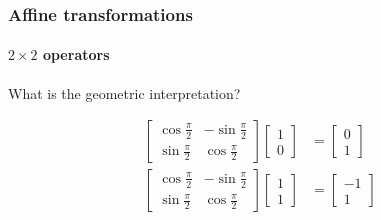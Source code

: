 \documentclass[xcolor=dvipsnames]{beamer}
\begin{document}
\begin{frame}
\frametitle{Affine transformations}
\framesubtitle{$2 \times 2$ operators}

  What is the geometric interpretation?

  \begin{align*}
    \left[ \begin{array}{rr}
      \cos \frac{\pi}{2} & -\sin \frac{\pi}{2} \\
      \sin \frac{\pi}{2} &  \cos \frac{\pi}{2}
      \end{array} \right]
    \left[ \begin{array}{r}
      1 \\
      0
      \end{array} \right]
    & = 
    \left[ \begin{array}{r}
      0 \\
      1
      \end{array} \right] \\
    \left[ \begin{array}{rr}
      \cos \frac{\pi}{2} & -\sin \frac{\pi}{2} \\
      \sin \frac{\pi}{2} &  \cos \frac{\pi}{2}
      \end{array} \right]
    \left[ \begin{array}{r}
      1 \\
      1
      \end{array} \right]
    & = 
    \left[ \begin{array}{r}
      -1 \\
      1
      \end{array} \right]
    \end{align*}

  \end{frame}
\end{document}
